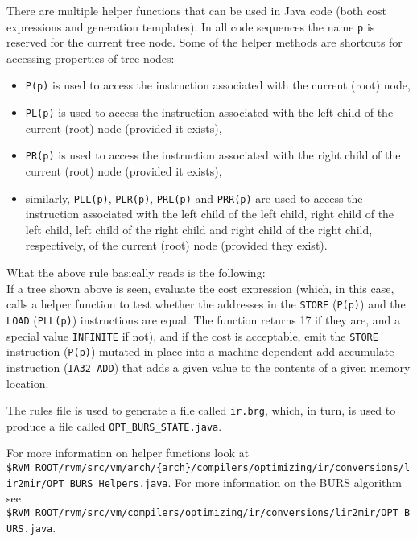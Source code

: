 There are multiple helper functions that can be used in Java code (both cost
expressions and generation templates).  In all code sequences the name
{\tt p} is reserved for the current tree node.  Some of the helper methods
are shortcuts for accessing properties of tree nodes:
\begin{itemize}
\item {\tt P(p)} is used to access the instruction associated with the
current (root) node,
\item {\tt PL(p)} is used to access the instruction associated with the left
child of the current (root) node (provided it exists),
\item {\tt PR(p)} is used to access the instruction associated with the
right child of the current (root) node (provided it exists),
\item similarly, {\tt PLL(p)}, {\tt PLR(p)}, {\tt PRL(p)} and {\tt PRR(p)}
are used to access the instruction associated with the
left child of the left child, right child of the left child, left child of
the right child and right child of the right child, respectively, of the
current (root) node (provided they exist).
\end{itemize}

What the above rule basically reads is the following:\\
If a tree shown above is seen, evaluate the cost expression (which, in this
case, calls a helper function to test whether the addresses in the
{\tt STORE} ({\tt P(p)}) and the {\tt LOAD} ({\tt PLL(p)}) instructions are
equal.  The function returns 17 if they are, and a special value
{\tt INFINITE} if not), and if the cost is acceptable, emit the {\tt STORE}
instruction ({\tt P(p)}) mutated in place into a machine-dependent
add-accumulate instruction ({\tt IA32\_ADD}) that adds a given value to the
contents of a given memory location.

The rules file is used to generate a file called {\tt ir.brg}, which, in
turn, is used to produce a file called {\tt OPT\_BURS\_STATE.java}.

For more information on helper functions look at
{\tt \$RVM\_ROOT/rvm/src/\-vm/\-arch/\-\{arch\}/com\-pi\-l\-ers/op\-ti\-mi\-z\-ing/ir/conver\-sions/lir2\-mir/OPT\_BURS\_Helpers.java}.
For more information on the BURS algorithm see
{\tt \$RVM\_ROOT/rvm/src/vm/compi\-l\-ers/op\-ti\-m\-i\-zing/ir/conver\-sions/lir2\-mir/OPT\_BURS.java}.

\JavaTMFooter

\PowerPCTMFooter


